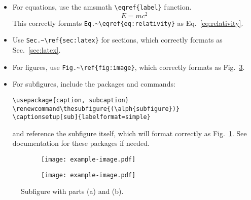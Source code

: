 \documentclass[10pt, letter]{article}
\renewcommand\thesubfigure{(\alph{subfigure})}
\begin{document}
\begin{itemize}
\item For equations, use the amsmath \verb|\eqref{label}| function.
  \begin{equation}\label{eq:relativity}
    E = mc^2
  \end{equation}
  This correctly formats \verb|Eq.~\eqref{eq:relativity}| as
  Eq.~\eqref{eq:relativity}.
\item Use \verb|Sec.~\ref{sec:latex}| for sections, which correctly
  formats as Sec.~\ref{sec:latex}.
\item For figures, use \verb|Fig.~\ref{fig:image}|, which correctly
  formats as Fig.~\ref{fig:multifig}.
\item For subfigures, include the packages and commands:
\begin{lstlisting}
\usepackage{caption, subcaption}
\renewcommand\thesubfigure{(\alph{subfigure})}
\captionsetup[sub]{labelformat=simple}
\end{lstlisting}
and reference the subfigure itself,
which will format correctly as Fig.~\ref{fig:multifig_a}. See
documentation for these packages if needed.
\end{itemize}

\begin{figure}[h]
  \centering
  \begin{subfigure}[b]{0.2\textwidth}
    \texttt{[image: example-image.pdf]}
    \caption{}\label{fig:multifig_a}
  \end{subfigure}\hspace{10pt}
    \begin{subfigure}[b]{0.2\textwidth}
    \texttt{[image: example-image.pdf]}
    \caption{\label{fig:multifig_b}}
  \end{subfigure}
  \caption{Subfigure with parts (a) and (b).}
  \label{fig:multifig}
\end{figure}
\end{document}

